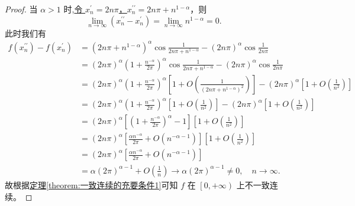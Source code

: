 \documentclass[../../main.tex]{subfiles}%
\begin{document}
\begin{proof}
当 $\alpha > 1$ 时,\hyperlink{找两个数列的方式123}{令 $x_{n}^{\prime} = 2n\pi$，$x_{n}^{\prime\prime} = 2n\pi + n^{1 - \alpha}$}，则
\[
\lim_{n \rightarrow \infty} \left( x_{n}^{\prime\prime} - x_{n}^{\prime} \right) = \lim_{n \rightarrow \infty} n^{1 - \alpha} = 0.
\]
此时我们有
\begin{align*}
f\left( x_{n}^{\prime\prime} \right) - f\left( x_{n}^{\prime} \right) &= \left( 2n\pi + n^{1 - \alpha} \right)^{\alpha} \cos \frac{1}{2n\pi + n^{1 - \alpha}} - \left( 2n\pi \right)^{\alpha} \cos \frac{1}{2n\pi} \\
&= \left( 2n\pi \right)^{\alpha} \left( 1 + \frac{n^{-\alpha}}{2\pi} \right)^{\alpha} \cos \frac{1}{2n\pi + n^{1 - \alpha}} - \left( 2n\pi \right)^{\alpha} \cos \frac{1}{2n\pi} \\
&= \left( 2n\pi \right)^{\alpha} \left( 1 + \frac{n^{-\alpha}}{2\pi} \right)^{\alpha} \left[ 1 + O\left( \frac{1}{\left( 2n\pi + n^{1 - \alpha} \right)^2} \right) \right] - \left( 2n\pi \right)^{\alpha} \left[ 1 + O\left( \frac{1}{n^2} \right) \right] \\
&= \left( 2n\pi \right)^{\alpha} \left( 1 + \frac{n^{-\alpha}}{2\pi} \right)^{\alpha} \left[ 1 + O\left( \frac{1}{n^2} \right) \right] - \left( 2n\pi \right)^{\alpha} \left[ 1 + O\left( \frac{1}{n^2} \right) \right] \\
&= \left( 2n\pi \right)^{\alpha} \left[ \left( 1 + \frac{n^{-\alpha}}{2\pi} \right)^{\alpha} - 1 \right] \left[ 1 + O\left( \frac{1}{n^2} \right) \right] \\
&= \left( 2n\pi \right)^{\alpha} \left[ \frac{\alpha n^{-\alpha}}{2\pi} + O\left( n^{-\alpha - 1} \right) \right] \left[ 1 + O\left( \frac{1}{n^2} \right) \right] \\
&= \left( 2n\pi \right)^{\alpha} \left[ \frac{\alpha n^{-\alpha}}{2\pi} + O\left( n^{-\alpha - 1} \right) \right] \\
&= \alpha \left( 2\pi \right)^{\alpha - 1} + O\left( \frac{1}{n} \right) \rightarrow \alpha \left( 2\pi \right)^{\alpha - 1} \ne 0, \quad n \rightarrow \infty.
\end{align*}
故根据\hyperref[theorem:一致连续的充要条件1]{定理\ref{theorem:一致连续的充要条件1}}可知 $f$ 在 $\left[ 0, +\infty \right)$ 上不一致连续。

\end{proof}
\end{document}
